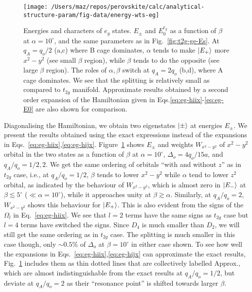 \documentclass[a4paper,prb,twocolumn]{revtex4-1}  %
\begin{document}
\begin{figure}[htbp]
\begin{center}
\texttt{[image: /Users/maz/repos/perovskite/calc/analytical-structure-param/fig-data/energy-wts-eg]}
\caption{
Energies and characters of $e_g$ states.
$E_{\pm}$ and $E_0^{e_g}$
as a function of $\beta$ at $\alpha=10^\circ$, 
and the same parameters as in Fig.~\ref{fig:t2g-ge-Es}.
At $q_A=q_o/2$ (a,c) where B cage dominates,
$\alpha$ tends to make $\ket{E_{+}}$
more $x^2-y^2$ (see small $\beta$ region),
while $\beta$ tends to do the opposite 
(see large $\beta$ region).
The roles of $\alpha,\beta$ switch
at $q_A=2q_o$ (b,d), where A cage dominates.
We see that the splitting is relatively small as compared to $t_{2g}$ manifold.
Approximate results obtained by a second order expansion of the Hamiltonian given in Eqs.\ref{eq:eg-hiix}-\ref{eq:eg-E0}
are also shown for comparison.
}
\label{fig:e-wts-eg}
\end{center}
\end{figure}

Diagonalising the Hamiltonian,
we obtain two eigenstates $\ket{\pm}$
at energies $E_{\pm}$.
We present the results obtained using 
 the exact expressions instead 
of the expansions in Eqs.~\ref{eq:eg-hiix},\ref{eq:eg-hijx}.
Figure~\ref{fig:e-wts-eg}
shows $E_{\pm}$ and weights $W_{x^2-y^2}$ of $x^2-y^2$ orbital
in the two states
as a function of $\beta$
at $\alpha=10^\circ$, $\Delta_o=4q_o/15a$,
and 
$q_A/q_o=1/2,2$.
We get the same ordering of orbitals ``with and without $z$''
 as in $t_{2g}$ case,
i.e.,
at $q_A/q_o=1/2$,
$\beta$ tends to lower
$x^2-y^2$ while $\alpha$ tend to lower $z^2$ orbital,
as indicated by the behaviour of $W_{x^2-y^2}$,
which is almost zero in $\ket{E_{-}}$ at $\beta\lesssim 5^\circ$
 ($\ll \alpha=10^\circ$),
while it approaches unity
at $\beta\gtrsim \alpha$.
Similarly, at $q_A/q_o=2$,
$W_{x^2-y^2}$ shows this behaviour for $\ket{E_{+}}$.
This is also evident from the signs of the $\Omega_l$
in Eq.~\ref{eq:eg-hiix}.
We see that $l=2$ terms have the same signs as $t_{2g}$ case but 
$l=4$ terms have switched the signs. 
Since $D_4$ is much smaller than $D_2$,
we will still get the same ordering as in $t_{2g}$ case.
The splitting is much smaller in this case though, only $\sim 0.5\%$ of $\Delta_o$
at $\beta=10^\circ$ in either case shown.
To see how well
the expansions in Eqs.~\ref{eq:eg-hiix},\ref{eq:eg-hijx}
can approximate the exact results,
Fig.~\ref{fig:e-wts-eg} includes
them as thin dotted lines that are collectively labelled Approx.,
 which are almost indistinguishable from the exact results
at $q_A/q_o=1/2$, but deviate at $q_A/q_o=2$ as their
``resonance point'' is shifted towards larger $\beta$.
\end{document}
